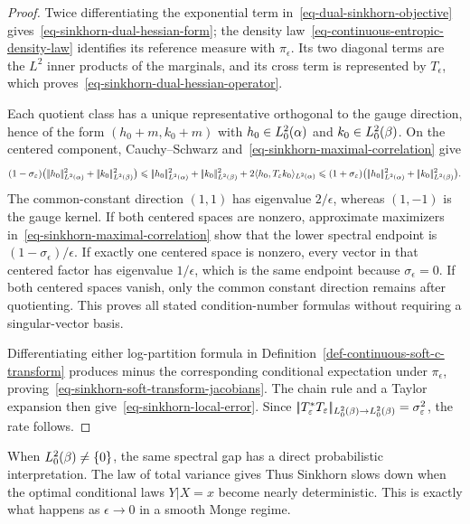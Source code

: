 \begin{proof}
Twice differentiating the exponential term in~\eqref{eq-dual-sinkhorn-objective} gives~\eqref{eq-sinkhorn-dual-hessian-form}; the density law~\eqref{eq-continuous-entropic-density-law} identifies its reference measure with $\pi_\epsilon$. Its two diagonal terms are the $L^2$ inner products of the marginals, and its cross term is represented by $T_\epsilon$, which proves~\eqref{eq-sinkhorn-dual-hessian-operator}.

Each quotient class has a unique representative orthogonal to the gauge direction, hence of the form
\(
(h_0+m,k_0+m)
\)
with $h_0\in L_0^2(\alpha)$ and $k_0\in L_0^2(\beta)$. On the centered component, Cauchy--Schwarz and~\eqref{eq-sinkhorn-maximal-correlation} give
\[
(1-\sigma_\epsilon)
\bigl(\norm{h_0}_{L^2(\al)}^2+\norm{k_0}_{L^2(\be)}^2\bigr)
\leq
\norm{h_0}_{L^2(\al)}^2+\norm{k_0}_{L^2(\be)}^2
+2\langle h_0,T_\epsilon k_0\rangle_{L^2(\al)}
\leq
(1+\sigma_\epsilon)
\bigl(\norm{h_0}_{L^2(\al)}^2+\norm{k_0}_{L^2(\be)}^2\bigr).
\]
The common-constant direction $(1,1)$ has eigenvalue $2/\epsilon$, whereas $(1,-1)$ is the gauge kernel. If both centered spaces are nonzero, approximate maximizers in~\eqref{eq-sinkhorn-maximal-correlation} show that the lower spectral endpoint is $(1-\sigma_\epsilon)/\epsilon$. If exactly one centered space is nonzero, every vector in that centered factor has eigenvalue $1/\epsilon$, which is the same endpoint because $\sigma_\epsilon=0$. If both centered spaces vanish, only the common constant direction remains after quotienting. This proves all stated condition-number formulas without requiring a singular-vector basis.

Differentiating either log-partition formula in Definition~\ref{def-continuous-soft-c-transform} produces minus the corresponding conditional expectation under $\pi_\epsilon$, proving~\eqref{eq-sinkhorn-soft-transform-jacobians}. The chain rule and a Taylor expansion then give~\eqref{eq-sinkhorn-local-error}. Since
\(|\!| T_\varepsilon^*T_\varepsilon |\!|_{L_0^2(\beta)\to L_0^2(\beta)}
=\sigma_\varepsilon^2\),
the rate follows.
\end{proof}
When $L_0^2(\beta)\neq\{0\}$, the same spectral gap has a direct probabilistic interpretation. The law of total variance gives
Thus Sinkhorn slows down when the optimal conditional laws $Y|X=x$ become nearly deterministic. This is exactly what happens as $\epsilon\to0$ in a smooth Monge regime.

